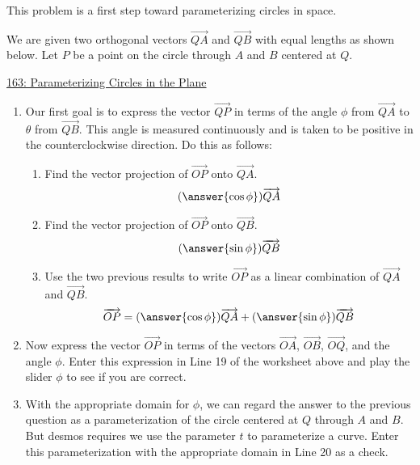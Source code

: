 \documentclass{ximera}
\begin{document}
\begin{question}  \label{Qdfds45rt54rr3tg}
This problem is a first step toward parameterizing circles in space. 

We are given two orthogonal vectors $\overrightarrow{QA}$ and $\overrightarrow{QB}$ with equal lengths as shown below. Let $P$ be a point on the circle through $A$ and $B$ centered at $Q$. 

\begin{onlineOnly}
    \begin{center}
\end{center}
\end{onlineOnly}

\href{https://www.desmos.com/calculator/l6vw2hzhnb}{163: Parameterizing Circles in the Plane}

\begin{enumerate}
\item{Our first goal is to express the vector $\overrightarrow{QP}$ in terms of the angle $\phi$ from $\overrightarrow{QA}$ to  $\theta$ from $\overrightarrow{QB}$. This angle is measured continuously and is taken to be positive in the counterclockwise direction. Do this as follows:}

\begin{enumerate}
\item{Find the vector projection of $\overrightarrow{OP}$ onto $\overrightarrow{QA}$.
\[
    ( \answer{\cos \phi} )\overrightarrow{QA}
\]
}
 \item{Find the vector projection of $\overrightarrow{OP}$ onto $\overrightarrow{QB}$.
\[
    ( \answer{\sin \phi} ) \overrightarrow{QB}
\]
}

\item{Use the two previous results to write $\overrightarrow{OP}$ as a linear combination of  $\overrightarrow{QA}$ and $\overrightarrow{QB}$.
\[
  \overrightarrow{OP} = ( \answer{\cos \phi} )\overrightarrow{QA} + (\answer{\sin \phi}) \overrightarrow{QB}
\]
}

\end{enumerate}

\item{Now express the vector $\overrightarrow{OP}$ in terms of the vectors $\overrightarrow{OA}$, $\overrightarrow{OB}$, $\overrightarrow{OQ}$, and the angle $\phi$. Enter this expression in Line 19 of the worksheet above and play the slider $\phi$ to see if you are correct. 
}

\item{With the appropriate domain for $\phi$, we can regard the answer to the previous question as a parameterization of the circle centered at $Q$ through $A$ and $B$. But desmos requires we use the parameter $t$ to parameterize a curve. Enter this parameterization with the appropriate domain in Line 20 as a check.}

\end{enumerate} 

\end{question}
\end{document}
